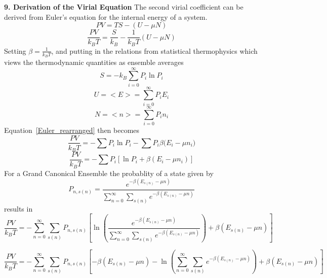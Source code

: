 \documentclass[12pt]{article}
\begin{document}
\noindent \textbf{9. Derivation of the Virial Equation}
The second virial coefficient can be derived from Euler's equation for the internal energy of a system.
\begin{equation}PV=TS-(U-\mu{N})\end{equation}
\begin{equation}\label{Euler_rearranged}\frac{PV}{k_BT}=\frac{S}{k_B}-\frac{1}{k_BT}(U-\mu{N})\end{equation}
Setting $\beta=\frac{1}{k_BT}$, and putting in the relations from statistical thermophysics which views the 
thermodynamic quantities as ensemble averages
\begin{equation}S=-k_B\sum_{i=0}^\infty{P_i\ln{P_i}}\end{equation}
\begin{equation}U=<E>=\sum_{i=0}^\infty{P_iE_i}\end{equation}
\begin{equation}N=<n>=\sum_{i=0}^\infty{P_in_i}\end{equation}
Equation~\ref{Euler_rearranged} then becomes
\begin{equation}\frac{PV}{k_BT}=-\sum{P_i\ln{P_i}}-\sum{P_i\beta(E_i-\mu
{n_i}})\end{equation}
\begin{equation}\frac{PV}{k_BT}=-\sum{P_i}\left[\ln{P_i}+\beta(E_i-\mu
{n_i})\right]\end{equation}
For a Grand Canonical Ensemble the probablity of a state given by
\begin{equation}P_{n,s(n)}=\frac{e^{-\beta(E_{s(n)}-\mu{n})}}{\sum_{n=0}^\infty\sum_{s(n)}e^{-\beta(E_{s(n)}-\mu{n})}}\end{equation}
results in 
\begin{equation}\frac{PV}{k_BT}=-\sum_{n=0}^\infty\sum_{s(n)}P_{n,s(n)}\left[\ln{\left(\frac{ e^{-\beta(E_{s(n)}-\mu{n})}}{\sum_{n=0}^\infty\sum_{s(n)}e^{-\beta(E_{s(n)}-\mu{n})}}\right)}+\beta(E_{s(n)}-\mu{n})\right]\end{equation}

\begin{equation}\frac{PV}{k_BT}=-\sum_{n=0}^\infty\sum_{s(n)}P_{n,s(n)}\left[-\beta(E_{s(n)}-\mu{n})-\ln{\left(\sum_{n=0}^\infty\sum_{s(n)}e^{-\beta(E_{s(n)}-\mu{n})}\right)}+\beta(E_{s(n)}-\mu{n})\right]\end{equation}
\end{document}
